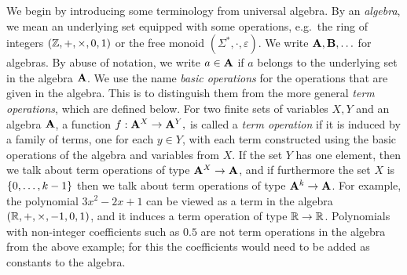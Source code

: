  We begin by introducing some terminology from universal algebra. By an \emph{algebra}, we mean an underlying set equipped with some  operations, e.g.~the ring of integers $(\mathbb Z, + , \times, 0, 1)$ or the free monoid $(\Sigma^*, \cdot, \varepsilon)$. We write $\mathbf{A}, \mathbf{B}, \ldots$ for algebras. By abuse of notation, we write $a \in \mathbf{A}$ if $a$ belongs to the underlying set in the algebra $\mathbf{A}$. 
We use the name \emph{basic operations} for the operations that are given in the algebra. This is to distinguish them from the more general \emph{term operations}, which are defined below.
        For two finite sets of variables $X,Y$ and an algebra $\mathbf{A}$, a function $f : \mathbf{A}^X \to \mathbf{A}^Y,$
            is called a \emph{term operation} if it is induced by a family of terms, one for each $y \in Y$, with each term  constructed using the basic operations of the algebra and variables from $X$.  If the set $Y$ has one element, then we talk about term operations of type $\mathbf{A}^X \to 
        \mathbf{A}$, and if furthermore the set $X$ is $\{0,\ldots,k-1\}$ then we talk about term operations of type $\mathbf{A}^k \to \mathbf{A}$.
        For example, the polynomial $3x^2 -2x+1$ can be viewed as a term in the algebra
            $(\mathbb R, +,\times, -1,0,1)$,
        and it induces a term operation of type $\mathbb R \to \mathbb R$. 
        Polynomials with non-integer coefficients such as $0.5$  are not term operations in the algebra from the above example; for this the coefficients would need to be added as constants to the algebra. 
        

